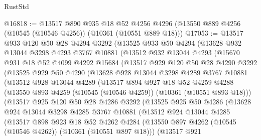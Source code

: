 \begin{lexlean}{RustStd}
\begin{coremodule}
@16818 := @13517
    @890
    @935
    @18
    @52
    @4256
    @4296
    (@13550 @889 @4256 (@10545 (@10546 @4256)) (@10361 (@10551 @889 @18)))
@17053 := @13517
    @933
    @120
    @50
    @28
    @4294
    @3292
    (@13525
      @933
      @50
      @4294
      (@13628
        @932
        @13044
        @3298
        @4293
        @3767
        @10881
        (@13512
          @932
          @13044
          @4293
          (@15670
            @931
            @18
            @52
            @4099
            @4292
            @15684
            (@13517
              @929
              @120
              @50
              @28
              @4290
              @3292
              (@13525
                @929
                @50
                @4290
                (@13628
                  @928
                  @13044
                  @3298
                  @4289
                  @3767
                  @10881
                  (@13512
                    @928
                    @13044
                    @4289
                    (@13517
                      @894
                      @927
                      @18
                      @52
                      @4259
                      @4288
                      (@13550 @893 @4259 (@10545 (@10546 @4259)) (@10361 (@10551 @893 @18)))
                      (@13517
                        @925
                        @120
                        @50
                        @28
                        @4286
                        @3292
                        (@13525
                          @925
                          @50
                          @4286
                          (@13628
                            @924
                            @13044
                            @3298
                            @4285
                            @3767
                            @10881
                            (@13512
                              @924
                              @13044
                              @4285
                              (@13517
                                @898
                                @923
                                @18
                                @52
                                @4262
                                @4284
                                (@13550
                                  @897
                                  @4262
                                  (@10545 (@10546 @4262))
                                  (@10361 (@10551 @897 @18)))
                                (@13517
                                  @921

\end{coremodule}
\end{lexlean}
